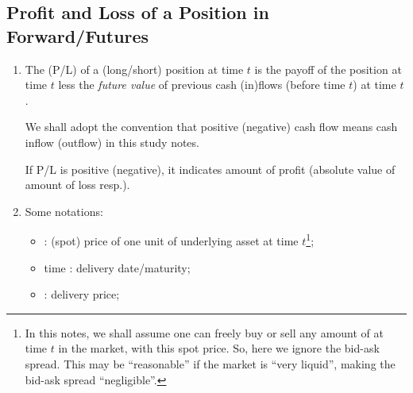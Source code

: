 \subsection{Profit and Loss of a Position in Forward/Futures}
\begin{enumerate}
\item The  (P/L) of a (long/short) position at time \(t\)
is the payoff of the position at time \(t\) less the \emph{future value} of
previous cash (in)flows (before time \(t\)) at time \(t\).

\begin{note}
We shall adopt the convention that positive (negative) cash flow means cash
inflow (outflow) in this study notes.
\end{note}
\begin{center}
\end{center}

\begin{note}
If P/L is positive (negative), it indicates amount of profit (absolute
value of amount of loss resp.).
\end{note}

\item Some notations:
\begin{itemize}
\item {}: (spot) price of one unit of underlying asset
 at time \(t\)\footnote{In this notes, we shall assume one
can freely buy or sell any amount of  at time \(t\) in the
market, with this spot price. So, here we ignore the bid-ask spread. This may
be ``reasonable'' if the market is ``very liquid'', making the bid-ask spread
``negligible''.};
\item time : delivery date/maturity;
\item {}: delivery price;
\end{itemize}



\end{enumerate}
